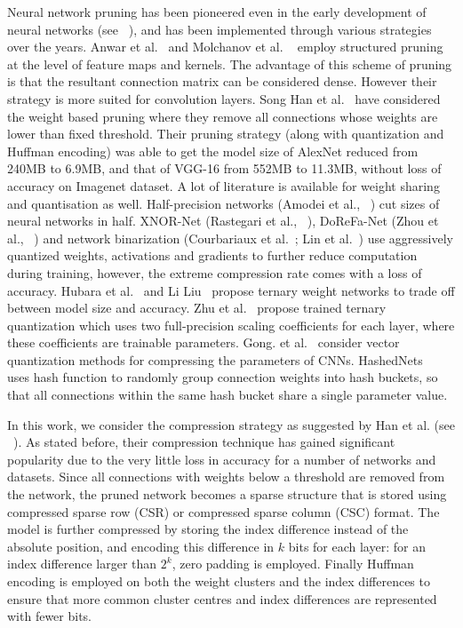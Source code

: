 Neural network pruning has been pioneered even in the early development of neural networks (see ~\cite{Reed93}), and has been implemented through various strategies over the years.
Anwar et  al.~\cite{AnwarHS17} and Molchanov et  al.  ~\cite{MolchanovTKAK16} employ structured pruning  at the level of feature maps and kernels. The advantage of this 
scheme of pruning is that the resultant connection matrix can be considered dense. However their strategy is more suited for 
convolution layers. Song Han et  al.~\cite{HanMD15} have considered the weight based pruning where they remove all connections whose weights are lower than fixed threshold. 
Their pruning strategy (along with quantization and Huffman encoding) was able to get the model size of AlexNet reduced  from 240MB to 6.9MB, 
and that of VGG-16 from 552MB to 11.3MB, without loss of accuracy on Imagenet dataset.
A lot of literature is available for weight sharing and quantisation as well. 
Half-precision networks (Amodei et al., ~\cite{AmodeiABCCCCCCD15}) cut sizes of neural networks in half. XNOR-Net (Rastegari et al., ~\cite{RastegariORF16}), 
DoReFa-Net (Zhou et al., ~\cite{ZhouNZWWZ16}) and network binarization (Courbariaux et al.~\cite{CourbariauxB16}; Lin et al.~\cite{LinCMB15}) use aggressively quantized weights, activations and gradients to further reduce computation during training, however, the extreme compression rate comes with a loss of accuracy. Hubara et al.~\cite{HubaraCSEB16} and Li  Liu~\cite{LiL16} propose ternary weight networks to trade off between model size and accuracy.
Zhu et  al.~\cite{ZhuHMD16}  propose trained ternary quantization which uses two full-precision scaling coefficients for each layer, where these coefficients are trainable parameters.
Gong. et  al.~\cite{GongLYB14} consider vector quantization methods for compressing the parameters of CNNs.
HashedNets~\cite{ChenWTWC15} uses hash function to randomly group connection weights into hash buckets, so that all connections within the same hash bucket share a single parameter value. 


In this work,  we consider the compression strategy as suggested by  Han et  al. (see ~\cite{HanMD15, HanPTD15}). As stated before, their compression technique has gained significant popularity due to the very little loss in accuracy for a number of networks and datasets. Since 
all connections with weights below a threshold are removed from the network, the pruned network becomes a 
sparse structure that is stored using compressed sparse row (CSR) or compressed sparse column (CSC) format.
The model is further compressed by storing the  index difference instead of the absolute position, and encoding this difference in 
$k$ bits for each layer: for an index difference larger than $2^k$,  zero padding is employed. 
Finally Huffman encoding is employed on both the weight clusters and the index differences to ensure that more common cluster centres and  index differences
are represented with fewer bits. 


